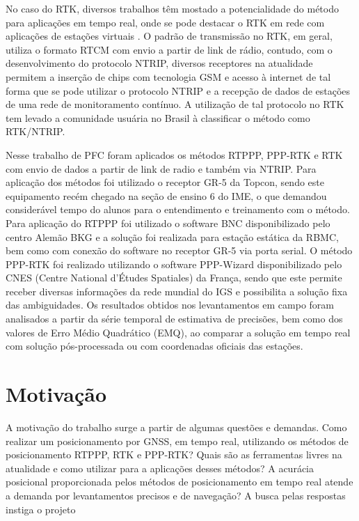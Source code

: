 No caso do RTK, diversos trabalhos têm mostado a potencialidade do método para aplicações em tempo real, onde se pode destacar o RTK em rede com aplicações de estações virtuais \citep{daniele}. O padrão de transmissão no RTK, em geral, utiliza o formato RTCM com envio a partir de link de rádio, contudo, com o desenvolvimento do protocolo NTRIP, diversos receptores na atualidade permitem a inserção de chips com tecnologia GSM e acesso à internet de tal forma que se pode utilizar o protocolo NTRIP e a recepção de dados de estações de uma rede de monitoramento contínuo. A utilização de tal protocolo no RTK tem levado a comunidade usuária no Brasil à classificar o método como RTK/NTRIP.


Nesse trabalho de PFC foram aplicados os métodos RTPPP, PPP-RTK e RTK com envio de dados a partir de link de radio e também via NTRIP. Para aplicação dos métodos foi utilizado o receptor GR-5 da Topcon, sendo este equipamento recém chegado na seção de ensino 6 do IME, o que demandou considerável tempo do alunos para o entendimento e treinamento com o método. Para aplicação do RTPPP foi utilizado o software BNC disponibilizado pelo centro Alemão BKG e a solução foi realizada para estação estática da RBMC, bem como com conexão do software no receptor GR-5 via porta serial. O método PPP-RTK foi realizado utilizando o software PPP-Wizard disponibilizado pelo CNES (Centre National d'Études Spatiales) da França, sendo que este permite receber diversas informações da rede mundial do IGS e possibilita a solução fixa das ambiguidades. 
Os resultados obtidos nos levantamentos em campo foram analisados a partir da série temporal de estimativa de precisões, bem como dos valores de Erro Médio Quadrático (EMQ), ao comparar a solução em tempo real com solução pós-processada ou com coordenadas oficiais das estações. 




\section{Motivação}
\label{motivacao}
\noindent

A motivação do trabalho surge a partir de algumas questões e demandas. Como realizar um posicionamento por GNSS, em tempo real, utilizando os métodos de posicionamento RTPPP, RTK e PPP-RTK? Quais são as ferramentas livres na atualidade e como utilizar para a aplicações desses métodos? A acurácia posicional proporcionada pelos métodos de posicionamento em tempo real atende a demanda por levantamentos precisos e de navegação? A busca pelas respostas instiga o projeto

